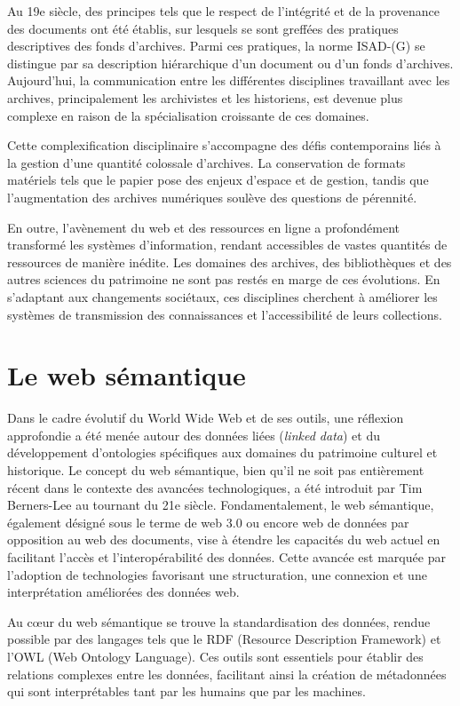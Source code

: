 \documentclass[12pt]{report}
\begin{document}
Au 19e siècle, des principes tels que le respect de l'intégrité et de la provenance des documents ont été établis, sur lesquels se sont greffées des pratiques descriptives des fonds d'archives. Parmi ces pratiques, la norme ISAD-(G) se distingue par sa description hiérarchique d'un document ou d'un fonds d'archives. Aujourd'hui, la communication entre les différentes disciplines travaillant avec les archives, principalement les archivistes et les historiens, est devenue plus complexe en raison de la spécialisation croissante de ces domaines.

Cette complexification disciplinaire s'accompagne des défis contemporains liés à la gestion d'une quantité colossale d'archives. La conservation de formats matériels tels que le papier pose des enjeux d'espace et de gestion, tandis que l'augmentation des archives numériques soulève des questions de pérennité.

En outre, l'avènement du web et des ressources en ligne a profondément transformé les systèmes d'information, rendant accessibles de vastes quantités de ressources de manière inédite. Les domaines des archives, des bibliothèques et des autres sciences du patrimoine ne sont pas restés en marge de ces évolutions. En s'adaptant aux changements sociétaux, ces disciplines cherchent à améliorer les systèmes de transmission des connaissances et l'accessibilité de leurs collections.
\chapter{Le web sémantique}
Dans le cadre évolutif du World Wide Web et de ses outils, une réflexion approfondie a été menée autour des données liées (\textit{linked data}) et du développement d'ontologies spécifiques aux domaines du patrimoine culturel et historique. Le concept du web sémantique, bien qu'il ne soit pas entièrement récent dans le contexte des avancées technologiques, a été introduit par Tim Berners-Lee au tournant du 21e siècle. Fondamentalement, le web sémantique, également désigné sous le terme de web 3.0 ou encore web de données par opposition au web des documents, vise à étendre les capacités du web actuel en facilitant l'accès et l'interopérabilité des données. Cette avancée est marquée par l'adoption de technologies favorisant une structuration, une connexion et une interprétation améliorées des données web.

Au cœur du web sémantique se trouve la standardisation des données, rendue possible par des langages tels que le RDF (Resource Description Framework) et l'OWL (Web Ontology Language). Ces outils sont essentiels pour établir des relations complexes entre les données, facilitant ainsi la création de métadonnées qui sont interprétables tant par les humains que par les machines.
\end{document}
